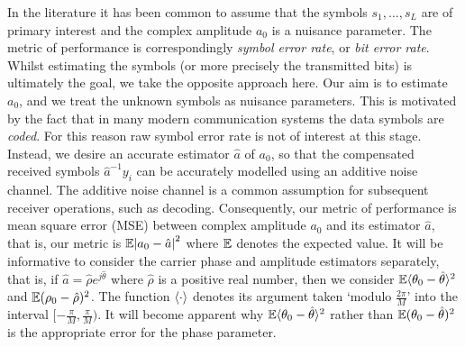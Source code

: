 \documentclass[conference]{IEEEtran}
\begin{document}

In the literature it has been common to assume that the symbols $s_1, \dots, s_L$ are of primary interest and the complex amplitude $a_0$ is a nuisance parameter.  The metric of performance is correspondingly \emph{symbol error rate}, or \emph{bit error rate}.  Whilst estimating the symbols (or more precisely the transmitted bits) is ultimately the goal, we take the opposite approach here.  Our aim is to estimate $a_0$, and we treat the unknown symbols as nuisance parameters.  This is motivated by the fact that in many modern communication systems the data symbols are \emph{coded}.  For this reason raw symbol error rate is not of interest at this stage.  Instead, we desire an accurate estimator $\hat{a}$ of $a_0$, so that the compensated received symbols $\hat{a}^{-1}y_i$ can be accurately modelled using an additive noise channel.  The additive noise channel is a common assumption for subsequent receiver operations, such as decoding.  Consequently, our metric of performance is mean square error (MSE) between complex amplitude $a_0$ and its estimator $\hat{a}$, that is, our metric is ${\mathbb E}{\left\vert a_0 - \hat{a} \right\vert}^2$ where ${\mathbb E}$ denotes the expected value. It will be informative to consider the carrier phase and amplitude estimators separately, that is, if $\hat{a} = \hat{\rho}e^{j\hat{\theta}}$ where $\hat{\rho}$ is a positive real number, then we consider ${\mathbb E}\langle\theta_0 - \hat{\theta}\rangle^2$ and ${\mathbb E}(\rho_0 - \hat{\rho})^2$.  The function $\left\langle \cdot \right\rangle$ denotes its argument taken `modulo $\tfrac{2\pi}{M}$' into the interval $[-\tfrac{\pi}{M}, \tfrac{\pi}{M})$.  It will become apparent why ${\mathbb E}\langle\theta_0 - \hat{\theta}\rangle^2$ rather than ${\mathbb E}(\theta_0 - \hat{\theta})^2$ is the appropriate error for the phase parameter.
\end{document}
